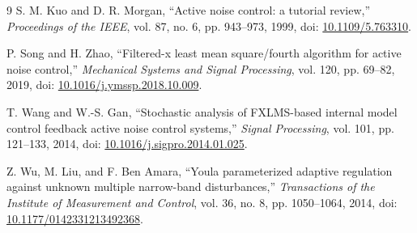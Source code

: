 \documentclass[UTF8,11pt,a4paper]{ctexart}
\begin{document}
\begin{thebibliography}{9}
S. M. Kuo and D. R. Morgan,
``Active noise control: a tutorial review,''
\emph{Proceedings of the IEEE}, vol. 87, no. 6, pp. 943--973, 1999,
doi: \href{https://doi.org/10.1109/5.763310}{10.1109/5.763310}.

P. Song and H. Zhao,
``Filtered-x least mean square/fourth algorithm for active noise control,''
\emph{Mechanical Systems and Signal Processing}, vol. 120, pp. 69--82, 2019,
doi: \href{https://doi.org/10.1016/j.ymssp.2018.10.009}{10.1016/j.ymssp.2018.10.009}.

T. Wang and W.-S. Gan,
``Stochastic analysis of FXLMS-based internal model control feedback active noise control systems,''
\emph{Signal Processing}, vol. 101, pp. 121--133, 2014,
doi: \href{https://doi.org/10.1016/j.sigpro.2014.01.025}{10.1016/j.sigpro.2014.01.025}.

Z. Wu, M. Liu, and F. Ben Amara,
``Youla parameterized adaptive regulation against unknown multiple narrow-band disturbances,''
\emph{Transactions of the Institute of Measurement and Control}, vol. 36, no. 8,
pp. 1050--1064, 2014, doi: \href{https://doi.org/10.1177/0142331213492368}{10.1177/0142331213492368}.
\end{thebibliography}
\end{document}

